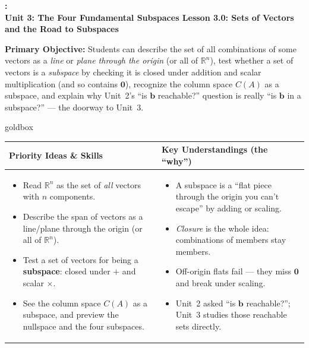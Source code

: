\documentclass[10pt]{article}
\newcommand{\zero}{\mathbf{0}}
\newcommand{\UnitNumberName}{Unit 3: The Four Fundamental Subspaces \quad}
\newcommand{\LessonNumberName}{Lesson 3.0: Sets of Vectors and the Road to Subspaces}
\begin{document}
\begin{center}
    {\Large\bfseries \CourseName: \SchoolYear \\
    {\small\bfseries \UnitNumberName \LessonNumberName}}
\end{center}

\begin{tcolorbox}[colback=blush, colframe=burgundy, boxrule=0.9pt, arc=2mm,
    left=2mm, right=2mm, top=1.5mm, bottom=1.5mm]
    \textbf{Primary Objective:} Students can describe the set of all combinations of some
    vectors as a \emph{line} or \emph{plane through the origin} (or all of $\mathbb{R}^n$),
    test whether a set of vectors is a \emph{subspace} by checking it is closed under addition
    and scalar multiplication (and so contains $\zero$), recognize the column space $C(A)$ as a
    subspace, and explain why Unit~2's ``is $\mathbf b$ reachable?'' question is really ``is
    $\mathbf b$ in a subspace?'' --- the doorway to Unit~3.
\end{tcolorbox}

\renewcommand{\arraystretch}{1.4}
\begin{skillbox}{goldbox}
\begin{tabularx}{\linewidth}{@{}X|X@{}}
\textbf{Priority Ideas \& Skills} & \textbf{Key Understandings (the ``why'')} \\[2pt]
\hline
\vspace{-6pt}
\begin{itemize}[leftmargin=1.1em, nosep, after=\vspace{2pt}]
  \item Read $\mathbb{R}^n$ as the set of \emph{all} vectors with $n$ components.
  \item Describe the span of vectors as a line/plane through the origin (or all of $\mathbb{R}^n$).
  \item Test a set of vectors for being a \textbf{subspace}: closed under $+$ and scalar $\times$.
  \item See the column space $C(A)$ as a subspace, and preview the nullspace and the four subspaces.
\end{itemize}
&
\vspace{-6pt}
\begin{itemize}[leftmargin=1.1em, nosep, after=\vspace{2pt}]
  \item A subspace is a ``flat piece through the origin you can't escape'' by adding or scaling.
  \item \emph{Closure} is the whole idea: combinations of members stay members.
  \item Off-origin flats fail --- they miss $\zero$ and break under scaling.
  \item Unit~2 asked ``is $\mathbf b$ reachable?''; Unit~3 studies those reachable sets directly.
\end{itemize}
\end{tabularx}
\end{skillbox}
\end{document}
